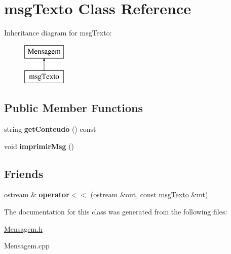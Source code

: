 \hypertarget{classmsg_texto}{}\section{msg\+Texto Class Reference}
\label{classmsg_texto}
Inheritance diagram for msg\+Texto\+:\begin{figure}[H]
\begin{center}
\leavevmode
\includegraphics[height=2.000000cm]{classmsg_texto}
\end{center}
\end{figure}
\subsection*{Public Member Functions}
\begin{DoxyCompactItemize}
\item 
\hypertarget{classmsg_texto_ab79a4329094490f284235855888f2656}{}string {\bfseries get\+Conteudo} () const \label{classmsg_texto_ab79a4329094490f284235855888f2656}

\item 
\hypertarget{classmsg_texto_ae3c3b04bb04afb3e114effec8a7071d4}{}void {\bfseries imprimir\+Msg} ()\label{classmsg_texto_ae3c3b04bb04afb3e114effec8a7071d4}

\end{DoxyCompactItemize}
\subsection*{Friends}
\begin{DoxyCompactItemize}
\item 
\hypertarget{classmsg_texto_ad84dea0e91e0526508d5cdf38d12292f}{}ostream \& {\bfseries operator$<$$<$} (ostream \&out, const \hyperlink{classmsg_texto}{msg\+Texto} \&mt)\label{classmsg_texto_ad84dea0e91e0526508d5cdf38d12292f}

\end{DoxyCompactItemize}


The documentation for this class was generated from the following files\+:\begin{DoxyCompactItemize}
\item 
\hyperlink{_mensagem_8h}{Mensagem.\+h}\item 
Mensagem.\+cpp\end{DoxyCompactItemize}
